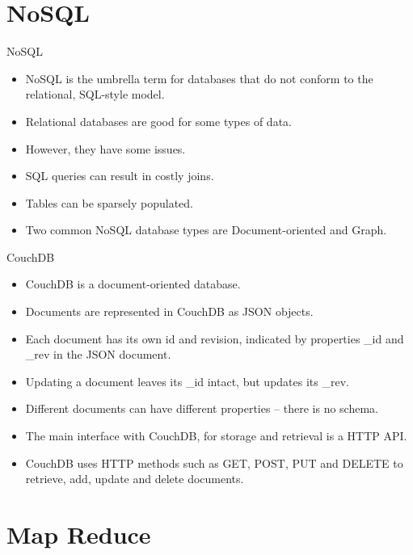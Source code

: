 \section{NoSQL}

\begin{frame}{NoSQL}
	\begin{itemize}
		\item NoSQL is the umbrella term for databases that do not conform to the relational, SQL-style model.
		\item Relational databases are good for some types of data.
		\item However, they have some issues.
		\item SQL queries can result in costly joins.
		\item Tables can be sparsely populated.
		\item Two common NoSQL database types are Document-oriented and Graph.
		
	\end{itemize}
\end{frame}

\begin{frame}{CouchDB}
	\begin{itemize}
		\item CouchDB is a document-oriented database.
		\item Documents are represented in CouchDB as JSON objects.
		\item Each document has its own id and revision, indicated by properties \_id and \_rev in the JSON document.
		\item Updating a document leaves its \_id intact, but updates its \_rev.
		\item Different documents can have different properties -- there is no schema.
		\item The main interface with CouchDB, for storage and retrieval is a HTTP API.
		\item CouchDB uses HTTP methods such as GET, POST, PUT and DELETE to retrieve, add, update and delete documents.
	\end{itemize}
\end{frame}



\section{Map Reduce}